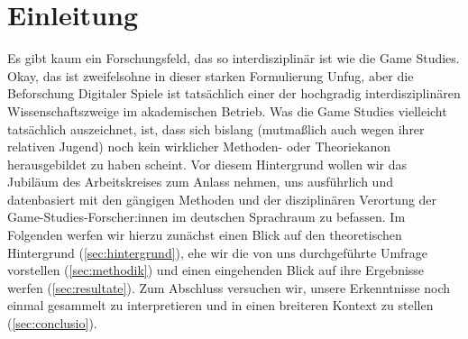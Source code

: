 \documentclass{scrartcl}
\begin{document}
\section{Einleitung}\label{sec:einleitung}
Es gibt kaum ein Forschungsfeld, das so interdisziplinär ist wie die Game Studies.
Okay, das ist zweifelsohne in dieser starken Formulierung Unfug, aber die Beforschung Digitaler Spiele ist tatsächlich einer der hochgradig interdisziplinären Wissenschaftszweige im akademischen Betrieb.
Was die Game Studies vielleicht tatsächlich auszeichnet, ist, dass sich bislang (mutmaßlich auch wegen ihrer relativen Jugend)\autocite[Vgl.][]{unterhuber_magic_2022} noch kein wirklicher Methoden- oder Theoriekanon herausgebildet zu haben scheint.
Vor diesem Hintergrund wollen wir das Jubiläum des Arbeitskreises zum Anlass nehmen, uns ausführlich und datenbasiert mit den gängigen Methoden und der disziplinären Verortung der Game-Studies-Forscher:innen im deutschen Sprachraum zu befassen.
Im Folgenden werfen wir hierzu zunächst einen Blick auf den theoretischen Hintergrund (\autoref{sec:hintergrund}), ehe wir die von uns durchgeführte Umfrage vorstellen (\autoref{sec:methodik}) und einen eingehenden Blick auf ihre Ergebnisse werfen (\autoref{sec:resultate}).
Zum Abschluss versuchen wir, unsere Erkenntnisse noch einmal gesammelt zu interpretieren und in einen breiteren Kontext zu stellen (\autoref{sec:conclusio}).


\end{document}
